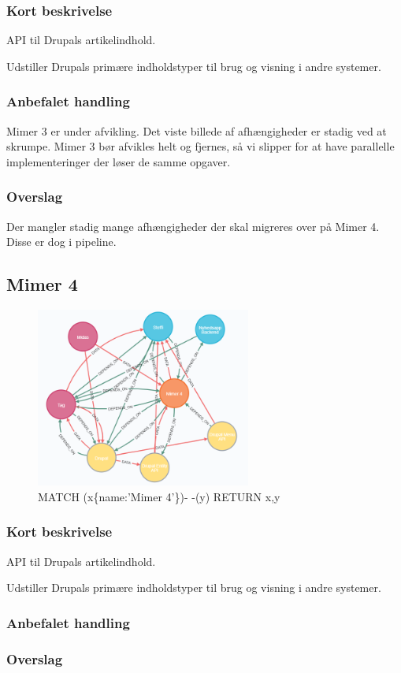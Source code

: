 \documentclass{article}
\begin{document}
\subsubsection{Kort beskrivelse}
API til Drupals artikelindhold.

Udstiller Drupals primære indholdstyper til brug og visning i andre systemer.
\subsubsection{Anbefalet handling}
Mimer 3 er under afvikling. Det viste billede af afhængigheder er stadig ved at skrumpe. Mimer 3 bør afvikles helt og fjernes, så vi slipper for at have parallelle implementeringer der løser de samme opgaver.
\subsubsection{Overslag}
Der mangler stadig mange afhængigheder der skal migreres over på Mimer 4. Disse er dog i pipeline.


\subsection{Mimer 4}
\begin{figure}[h]
\includegraphics[width=200pt]{Mimer4.PNG}
\caption{MATCH (x\{name:'Mimer 4'\})- -(y) RETURN x,y}
\end{figure}
\subsubsection{Kort beskrivelse}
API til Drupals artikelindhold.

Udstiller Drupals primære indholdstyper til brug og visning i andre systemer.
\subsubsection{Anbefalet handling}
\subsubsection{Overslag}
\end{document}

